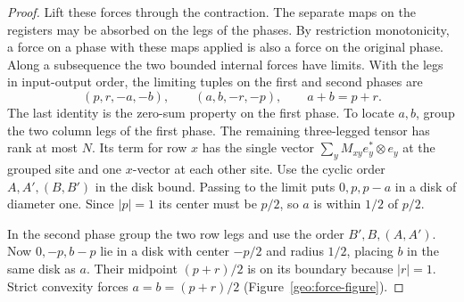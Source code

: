 \begin{proof}
Lift these forces through the contraction. The separate maps on
the registers may be absorbed on the legs of the phases. By
restriction monotonicity, a force on a phase with these maps applied
is also a force on the original phase. Along a subsequence the two
bounded internal forces have limits. With the legs in input-output
order, the limiting tuples on the first and second phases are
\[
       (p,r,-a,-b),\qquad (a,b,-r,-p),\qquad a+b=p+r .
\]
The last identity is the zero-sum property on the first phase.
To locate $a,b$, group the two column legs of the first phase.
The remaining three-legged tensor has rank at most $N$. Its term
for row $x$ has the single vector $\sum_y M_{xy}e_y^*\otimes e_y$
at the grouped site and one $x$-vector at each other site.
Use the cyclic order $A,A',(B,B')$ in the disk bound. Passing to the
limit puts $0,p,p-a$ in a disk of diameter one. Since $|p|=1$ its
center must be $p/2$, so $a$ is within $1/2$ of $p/2$.

In the second phase group the two row legs and use the order
$B',B,(A,A')$. Now $0,-p,b-p$ lie in a disk with center $-p/2$
and radius $1/2$, placing $b$ in the same disk as $a$. Their midpoint
$(p+r)/2$ is on its boundary because $|r|=1$. Strict convexity forces
$a=b=(p+r)/2$ (Figure~\ref{geo:force-figure}).


\end{proof}
